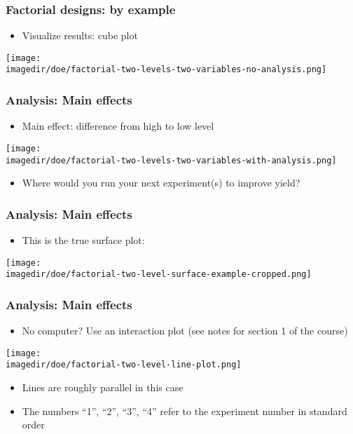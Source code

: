 \begin{frame}\frametitle{Factorial designs: by example}
	\begin{itemize}
		\item	Visualize results: cube plot
	\end{itemize}
	
	\vspace{12pt}
	\begin{center}
		\texttt{[image: \\imagedir/doe/factorial-two-levels-two-variables-no-analysis.png]}
	\end{center}
\end{frame}

\begin{frame}\frametitle{Analysis: Main effects}
	\begin{itemize}
		\item	Main effect: difference from high to low level
	\end{itemize}
	\begin{center}
		\texttt{[image: \\imagedir/doe/factorial-two-levels-two-variables-with-analysis.png]}
	\end{center}
	\begin{itemize}
		\item	Where would you run your next experiment(s) to improve yield?
	\end{itemize}
\end{frame}

\begin{frame}\frametitle{Analysis: Main effects}
	\begin{itemize}
		\item	This is the true surface plot:
	\end{itemize}
	\begin{center}
		\texttt{[image: \\imagedir/doe/factorial-two-level-surface-example-cropped.png]}
	\end{center}
\end{frame}

\begin{frame}\frametitle{Analysis: Main effects}
	\begin{itemize}
		\item	No computer? Use an interaction plot {\scriptsize (see notes for section 1 of the course)}
	\end{itemize}
	\begin{center}
		\texttt{[image: \\imagedir/doe/factorial-two-level-line-plot.png]}
	\end{center}
	\begin{itemize}
		\item	Lines are roughly parallel in this case
		\item	The numbers ``1'', ``2'', ``3'', ``4'' refer to the experiment number in standard order
	\end{itemize}
\end{frame}

